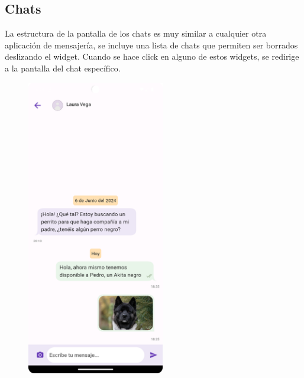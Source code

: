 \documentclass[a4paper, 12pt]{article}
\begin{document}
\newpage
\subsection*{Chats}

La estructura de la pantalla de los chats es muy similar a cualquier otra aplicación de mensajería, se incluye una lista de chats que permiten ser borrados deslizando el widget. Cuando se hace click en alguno de estos widgets, se redirige a la pantalla del chat específico.

\begin{figure}[H]
	\begin{center}
			{\includegraphics[width=6cm]{app/ChatRoom.png}\par}
	\end{center}  
\end{figure}
\end{document}
